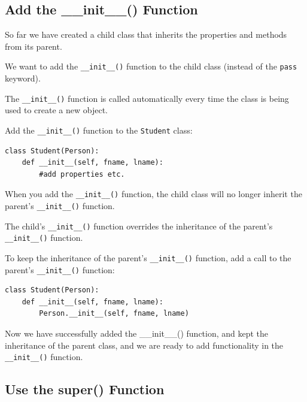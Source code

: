 \documentclass[12pt,a4paper]{article}
\newcommand{\code}[1]{%
	\colorbox{backcolour}{\lstinline{#1}}%
}
\newcommand{\lcode}[1]{%
	\lstinline{#1}%
}
\begin{document}
\subsection{Add the \_\_init\_\_() Function}

So far we have created a child class that inherits the properties and methods
from its parent.

We want to add the \code{__init__()} function to the child class (instead of
the \code{pass} keyword).

\begin{nbox}
The \lcode{__init__()} function is called automatically every time the class is
being used to create a new object.
\end{nbox}

\begin{ebox}
Add the \lcode{__init__()} function to the \lcode{Student} class:
	\begin{lstlisting}
class Student(Person):
    def __init__(self, fname, lname):
        #add properties etc.
	\end{lstlisting}
\end{ebox}

When you add the \code{__init__()} function, the child class will no longer
inherit the parent's \code{__init__()} function.

\begin{nbox}
The child's \lcode{__init__()} function overrides the inheritance of the
parent's \lcode{__init__()} function.
\end{nbox}

To keep the inheritance of the parent's \code{__init__()} function, add a call
to the parent's \code{__init__()} function:

\begin{ebox}
	\begin{lstlisting}
class Student(Person):
    def __init__(self, fname, lname):
        Person.__init__(self, fname, lname)
	\end{lstlisting}
\end{ebox}

Now we have successfully added the \_\_init\_\_() function, and kept the
inheritance of the parent class, and we are ready to add functionality in the
\code{__init__()} function.
\subsection{Use the super() Function}
\end{document}

